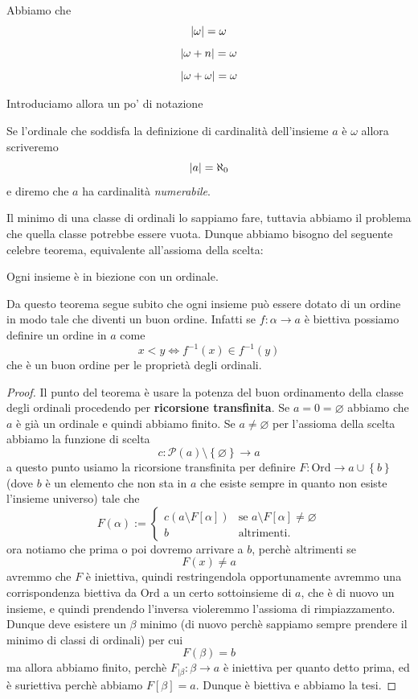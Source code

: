 \documentclass[11pt]{scrartcl}
\newcommand{\eset}{\varnothing}
\newcommand{\parti}[1]{\mathcal{P}\!\left(#1\right)}
\begin{document}
 	\begin{example}
 		Abbiamo che
 		$$\left\lvert \omega \right\rvert=\omega$$
 		$$\left\lvert \omega+n \right\rvert=\omega$$
 		$$\left\lvert \omega+\omega \right\rvert=\omega$$
 	\end{example}
 	Introduciamo allora un po' di notazione
 	\begin{definition}
 		Se l'ordinale che soddisfa la definizione di cardinalità dell'insieme $a$ è $\omega$ allora scriveremo
 		$$\left\lvert a \right\rvert=\aleph_0$$
 		e diremo che $a$ ha cardinalità \textit{numerabile}.
 	\end{definition}
 	Il minimo di una classe di ordinali lo sappiamo fare, tuttavia abbiamo il problema che quella classe potrebbe essere vuota. Dunque abbiamo bisogno del seguente celebre teorema, equivalente all'assioma della scelta:
 	\begin{theorem}
 		Ogni insieme è in biezione con un ordinale.
 	\end{theorem}
 	\begin{remark}
 		Da questo teorema segue subito che ogni insieme può essere dotato di un ordine in modo tale che diventi un buon ordine. Infatti se $f:\alpha \to a$ è biettiva possiamo definire un ordine in $a$ come
 		$$x<y \iff f^{-1}(x)\in f^{-1}(y)$$
 		che è un buon ordine per le proprietà degli ordinali.
 	\end{remark}
 	\begin{proof}
 		Il punto del teorema è usare la potenza del buon ordinamento della classe degli ordinali procedendo per \textbf{ricorsione transfinita}. Se $a=0=\eset$ abbiamo che $a$ è già un ordinale e quindi abbiamo finito. Se $a\ne \eset$ per l'assioma della scelta abbiamo la funzione di scelta 
 		$$c:\parti{a}\setminus\left\{\eset\right\}\to a$$
 		a questo punto usiamo la ricorsione transfinita per definire $F:\text{Ord}\to a\cup \left\{b\right\}$ (dove $b$ è un elemento che non sta in $a$ che esiste sempre in quanto non esiste l'insieme universo) tale che
 		$$F(\alpha):=\begin{cases}
 			c\left(a\setminus F[\alpha]\right) & \text{se $a\setminus F[\alpha]\ne \eset$} \\
 			b & \text{altrimenti.}
 		\end{cases}$$
 		ora notiamo che prima o poi dovremo arrivare a $b$, perchè altrimenti se 
 		$$F(x)\ne a$$
 		avremmo che $F$ è iniettiva, quindi restringendola opportunamente avremmo una corrispondenza biettiva da $\text{Ord}$ a un certo sottoinsieme di $a$, che è di nuovo un insieme, e quindi prendendo l'inversa violeremmo l'assioma di rimpiazzamento. Dunque deve esistere un $\beta$ minimo (di nuovo perchè sappiamo sempre prendere il minimo di classi di ordinali) per cui
 		$$F(\beta)=b$$
 		ma allora abbiamo finito, perchè $F_{\mid \beta}:\beta \to a$ è iniettiva per quanto detto prima, ed è suriettiva perchè abbiamo $F[\beta]=a$. Dunque è biettiva e abbiamo la tesi.
 	\end{proof}
\end{document}
